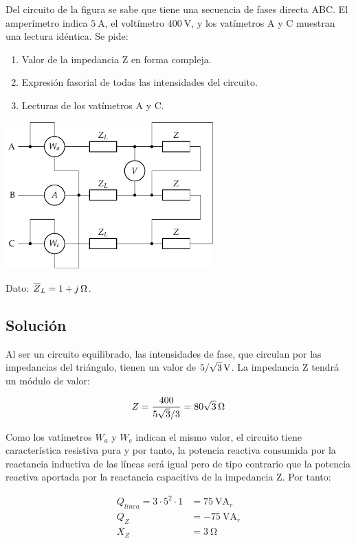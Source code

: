 Del circuito de la figura se sabe que tiene una secuencia de fases
directa ABC. El amperímetro indica $\SI{5}{\ampere}$, el voltímetro
$\SI{400}{\volt}$, y los vatímetros A y C muestran una lectura
idéntica. Se pide:

\begin{enumerate}
\item Valor de la impedancia Z en forma compleja.
\item Expresión fasorial de todas las intensidades del circuito.
\item Lecturas de los vatímetros A y C.
\end{enumerate}

\begin{center}
  \includegraphics[width = 0.6\textwidth]{figuras/BT3_12}
\end{center}

Dato: $\overline{Z}_L = \SI[parse-numbers = false]{1 + j}{\ohm}$.

\subsection*{Solución}

Al ser un circuito equilibrado, las intensidades de fase, que
circulan por las impedancias del triángulo, tienen un valor de
$\SI[parse-numbers=false]{5/\sqrt{3}}{\volt}$. La impedancia Z
tendrá un módulo de valor:

\[
  Z = \frac{400}{5\sqrt{3}/3} =
  \SI[parse-numbers=false]{80\sqrt{3}}{\ohm}
\]

Como los vatímetros $W_a$ y $W_c$ indican el mismo valor, el
circuito tiene característica resistiva pura y por tanto, la
potencia reactiva consumida por la reactancia inductiva de las
líneas será igual pero de tipo contrario que la potencia reactiva
aportada por la reactancia capacitiva de la impedancia Z. Por tanto:

\begin{align*}
  Q_{linea} = 3 \cdot 5^2 \cdot 1 &= \SI{75}{\volt\ampere}_r\\
  Q_Z &= -\SI{75}{\volt\ampere}_r\\
  X_Z &= \SI{3}{\ohm}
\end{align*}

